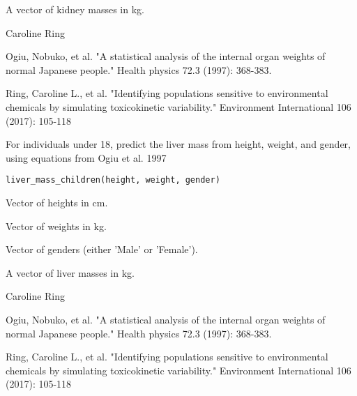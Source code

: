 \documentclass[a4paper]{book}
\begin{document}
%
\begin{Value}
A vector of kidney masses in kg.
\end{Value}
%
\begin{Author}\relax
Caroline Ring
\end{Author}
%
\begin{References}\relax
Ogiu, Nobuko, et al. "A statistical analysis of the internal 
organ weights of normal Japanese people." Health physics 72.3 (1997): 368-383.

Ring, Caroline L., et al. "Identifying populations sensitive to
environmental chemicals by simulating toxicokinetic variability."
Environment International 106 (2017): 105-118
\end{References}
%
\begin{Description}\relax
For individuals under 18, predict the liver mass from height, weight, and
gender, using equations from Ogiu et al. 1997
\end{Description}
%
\begin{Usage}
\begin{verbatim}
liver_mass_children(height, weight, gender)
\end{verbatim}
\end{Usage}
%
\begin{Arguments}
\begin{ldescription}
\item[\code{height}] Vector of heights in cm.

\item[\code{weight}] Vector of weights in kg.

\item[\code{gender}] Vector of genders (either 'Male' or 'Female').
\end{ldescription}
\end{Arguments}
%
\begin{Value}
A vector of liver masses in kg.
\end{Value}
%
\begin{Author}\relax
Caroline Ring
\end{Author}
%
\begin{References}\relax
Ogiu, Nobuko, et al. "A statistical analysis of the internal 
organ weights of normal Japanese people." Health physics 72.3 (1997): 368-383.

Ring, Caroline L., et al. "Identifying populations sensitive to
environmental chemicals by simulating toxicokinetic variability."
Environment International 106 (2017): 105-118
\end{References}
\end{document}
